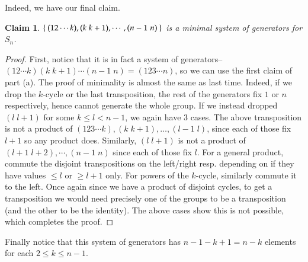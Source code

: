 \documentclass[12pt]{article}
\theoremstyle{definitionstyle}
\newtheorem*{claim}{Claim}
\begin{document}
\begin{enumerate}[leftmargin=\labelsep]
\begin{enumerate}
			Indeed, we have our final claim.
			\begin{claim}
				$\Set{(12 \cdots k), (k \; k+1), \cdots, (n-1 \; n)}$ is a minimal system of generators for $S_n$.
			\end{claim}
			\begin{proof}
				First, notice that it is in fact a system of generators--$(12 \cdots k)(k \; k+1) \cdots (n-1 \; n) = (123 \cdots n)$, so we can use the first claim of part (a). The proof of minimality is almost the same as last time. Indeed, if we drop the $k$-cycle or the last transposition, the rest of the generators fix $1$ or $n$ respectively, hence cannot generate the whole group. If we instead dropped $(l \; l+1)$ for some $k \leq l < n-1$, we again have 3 cases. The above transposition is not a product of $(123 \cdots k), (k \; k+1), \ldots, (l-1 \; l)$, since each of those fix $l+1$ so any product does. Similarly, $(l \; l+1)$ is not a product of $(l+1 \; l+2), \cdots, (n-1 \; n)$ since each of those fix $l$. For a general product, commute the disjoint transpositions on the left/right resp. depending on if they have values $\leq l$ or $\geq l+1$ only. For powers of the $k$-cycle, similarly commute it to the left. Once again since we have a product of disjoint cycles, to get a transposition we would need precisely one of the groups to be a transposition (and the other to be the identity). The above cases show this is not possible, which completes the proof.
			\end{proof}
			Finally notice that this system of generators has $n-1 - k + 1 = n-k$ elements for each $2 \leq k \leq n-1$.
		\end{enumerate}
	\end{enumerate}
\end{document}
